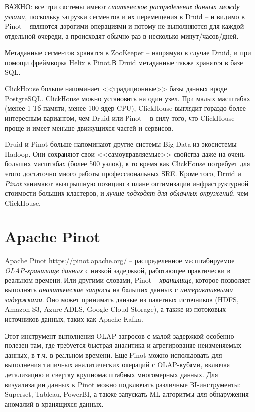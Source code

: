 \documentclass[%
	11pt,
	a4paper,
	utf8,
		]{article}
\begin{document}
ВАЖНО: все три системы имеют \emph{статическое распределение данных между узлами}, поскольку загрузки сегментов и их перемещения в Druid -- и видимо в Pinot -- являются дорогими операциями и потому не выполняются для каждой отдельной очереди, а происходят обычно раз в несколько минут/часов/дней.

Метаданные сегментов хранятся в ZooKeeper -- напрямую в случае Druid, и при помощи фреймворка Helix в Pinot.В Druid метаданные также хранятся в базе SQL.

ClickHouse больше напоминает <<традиционные>> базы данных вроде PostgreSQL. ClickHouse можно установить на один узел. При малых масштабах (менее 1 Тб памяти, менее 100 ядер CPU), ClickHouse выглядит гораздо более интересным вариантом, чем Druid или Pinot -- в силу того, что ClickHouse проще и имеет меньше движущихся частей и сервисов. 

Druid и Pinot больше напоминают другие системы Big Data из экосистемы Hadoop. Они сохраняют свои <<самоуправляемые>> свойства даже на очень больших масштабах (более 500 узлов), в то время как ClickHouse потребует для этого достаточно много работы профессиональных SRE. Кроме того, Druid и \emph{Pinot} занимают выигрышную позицию в плане оптимизации инфраструктурной стоимости больших кластеров, и \emph{лучше подходят для облачных окружений}, чем ClickHouse.

\section{Apache Pinot}

Apache Pinot \url{https://pinot.apache.org/} -- распределенное масштабируемое \emph{OLAP-хранилище данных} с низкой задержкой, работающее практически в реальном времени. Или другими словами, Pinot -- \emph{хранилище}, которое позволяет выполнять \emph{аналитические запросы} на больших данных с \emph{интерактивными задержками}. Оно может принимать данные из пакетных источников (HDFS, Amazon S3, Azure ADLS, Google Cloud Storage), а также из потоковых источников данных, таких как Apache Kafka.

Этот инструмент выполнения OLAP-запросов с малой задержкой особенно полезен там, где требуется быстрая аналитика и агрегирование неизменяемых данных, в т.ч. в реальном времени. Еще Pinot можно использовать для выполнения типичных аналитических операций с OLAP-кубами, включая детализацию и свертку крупномасштабных многомерных данных. Для визуализации данных к Pinot можно подключать различные BI-инструменты: Superset, Tableau, PowerBI, а также запускать ML-алгоритмы для обнаружения аномалий в хранящихся данных.
\end{document}
